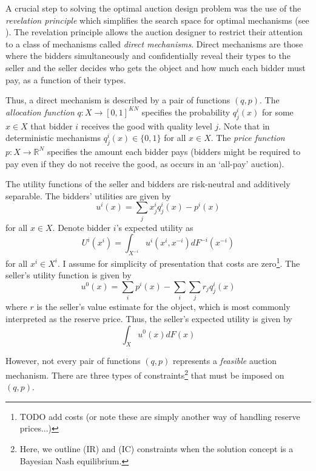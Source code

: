 \documentclass{article}
\begin{document}
A crucial step to solving the optimal auction design problem was the use of the \textit{revelation principle} which simplifies the search space for optimal mechanisms (see \cite[Lemma 1]{myerson1981optimal}). The revelation principle allows the auction designer to restrict their attention to a class of mechanisms called \textit{direct mechanisms}. Direct mechanisms are those where the bidders simultaneously and confidentially reveal their types to the seller and the seller decides who gets the object and how much each bidder must pay, as a function of their types.

Thus, a direct mechanism is described by a pair of functions $(q, p)$. The \textit{allocation function} $q:X\to[0,1]^{KN}$ specifies the probability $q_j^i(x)$ for some $x \in X$ that bidder $i$ receives the good with quality level $j$. Note that in deterministic mechanisms $q_j^i(x) \in \{0,1\}$ for all $x \in X$. The \textit{price function} $p:X\to\mathbb{R}^N$ specifies the amount each bidder pays (bidders might be required to pay even if they do not receive the good, as occurs in an `all-pay' auction).

The utility functions of the seller and bidders are risk-neutral and additively separable. The bidders' utilities are given by
\begin{equation}
    u^i(x) = \sum_j x_j^i q_j^i(x) - p^i(x)
\end{equation}
\noindent for all $x \in X$. Denote bidder $i$'s expected utility as
\begin{equation}\label{eq_expected_U}
    U^i(x^i) = \int_{X^{-i}} u^i(x^i,x^{-i}) dF^{-i}(x^{-i})
\end{equation}
\noindent for all $x^i \in X^i$. I assume for simplicity of presentation that costs are zero\footnote{\color{red}TODO add costs (or note these are simply another way of handling reserve prices...)}. The seller's utility function is given by
\begin{equation}
    u^0(x) = \sum_i p^i(x) - \sum_i \sum_j r_j q_j^i(x)  
\end{equation}
\noindent where $r$ is the seller's value estimate for the object, which is most commonly interpreted as the reserve price. Thus, the seller's expected utility is given by
\begin{equation}
    \int_X u^0(x) dF(x)
\end{equation}

However, not every pair of functions $(q,p)$ represents a \textit{feasible} auction mechanism. There are three types of constraints\footnote{Here, we outline (IR) and (IC) constraints when the solution concept is a Bayesian Nash equilibrium.} that must be imposed on $(q,p)$. 
\end{document}
